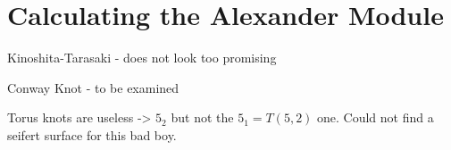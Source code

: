 \section{Calculating the Alexander Module}

Kinoshita-Tarasaki - does not look too promising

Conway Knot - to be examined

Torus knots are useless -> $5_2$ but not the $5_1=T(5, 2)$ one. Could not find a seifert surface for this bad boy.
